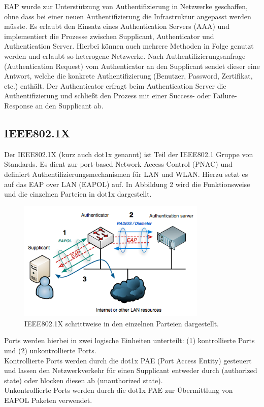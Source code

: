 \documentclass[conference]{IEEEtran}
\begin{document}
EAP wurde zur Unterstützung von Authentifizierung in Netzwerke geschaffen, ohne dass  bei einer neuen Authentifizierung die Infrastruktur angepasst werden müsste. Es erlaubt den Einsatz eines Authentication Servers (AAA) und implementiert die Prozesse zwischen Supplicant, Authenticator und Authentication Server. Hierbei können auch mehrere Methoden in Folge genutzt werden und erlaubt so heterogene Netzwerke. Nach Authentifizierungsanfrage (Authentication Request) vom Authenticator an den Supplicant sendet dieser eine Antwort, welche die konkrete Authentifizierung (Benutzer, Password, Zertifikat, etc.) enthält. Der Authenticator erfragt beim Authentication Server die Authentifizierung und schließt den Prozess mit einer Success- oder Failure-Response an den Supplicant ab.

\subsection{IEEE802.1X}
Der IEEE802.1X (kurz auch dot1x genannt) ist Teil der IEEE802.1 Gruppe von Standards. Es dient zur port-based Network Access Control (PNAC) und definiert Authentifizierungsmechanismen für LAN und WLAN. Hierzu setzt es auf das EAP over LAN (EAPOL) auf. In Abbildung 2 wird die Funktionsweise und die einzelnen Parteien in dot1x dargestellt.\\

\begin{figure}[hbt]
	\centering
	\includegraphics[width=9cm]{figures/dot1x}
	\caption{IEEE802.1X schrittweise in den einzelnen Parteien dargestellt.}
\end{figure}

Ports werden hierbei in zwei logische Einheiten unterteilt: (1) kontrollierte Ports und (2) unkontrollierte Ports.\\
Kontrollierte Ports werden durch die dot1x PAE (Port Access Entity) gesteuert und lassen den Netzwerkverkehr für einen Supplicant entweder durch (authorized state) oder blocken diesen ab (unauthorized state).\\
Unkontrollierte Ports werden durch die dot1x PAE zur Übermittlung von EAPOL Paketen verwendet.
\end{document}

